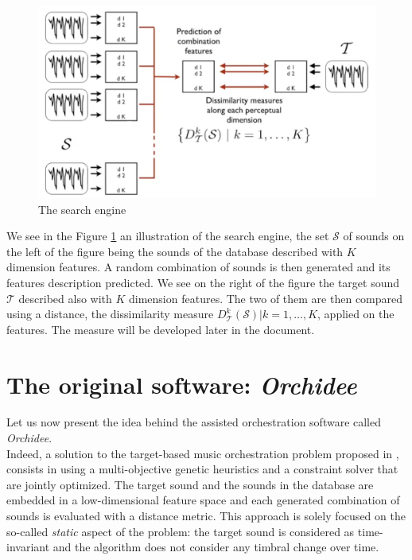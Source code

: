 \documentclass[a4paper]{book}
\begin{document}
\begin{figure}[h!]
\centering
\includegraphics[scale=0.4]{searchengine.png}
\caption{The search engine}
\label{fig:searchengine}
\end{figure}

We see in the Figure \ref{fig:searchengine} an illustration of the search engine, the set $\mathcal{S}$ of sounds on the left of the figure being the sounds of the database described with $K$ dimension features. A random combination of sounds is then generated and its features description predicted. We see on the right of the figure the target sound $\mathcal{T}$ described also with $K$ dimension features. The two of them are then compared using a distance, the dissimilarity measure $D^k_\mathcal{T}(\mathcal{S}) | k=1,\ldots,K$, applied on the features. The measure will be developed later in the document.\\

\section{The original software: \textit{Orchidee}}%

Let us now present the idea behind the assisted orchestration software called \textit{Orchidee}.\\
Indeed, a solution to the target-based music orchestration problem proposed in \cite{carpentier2007evolutionary}, consists in using a multi-objective genetic heuristics and a constraint solver that are jointly optimized. The target sound and the sounds in the database are embedded in a low-dimensional feature space and each generated combination of sounds is evaluated with a distance metric. 
This approach is solely focused on the so-called \emph{static} aspect of the problem: the target sound is considered as time-invariant and the algorithm does not consider any timbral change over time.
\end{document}
